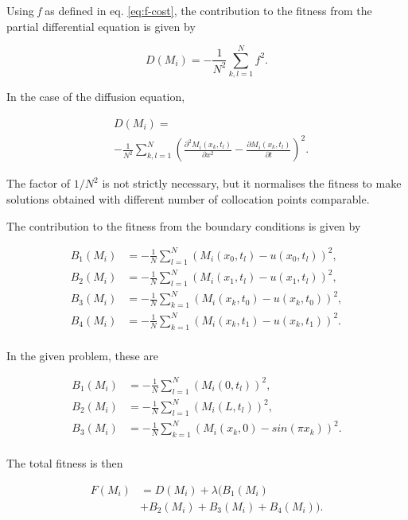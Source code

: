 \documentclass[multicolumn, 9pt]{extarticle}
\begin{document}
Using \textit{f} as defined in eq. \eqref{eq:f-cost}, the contribution to the fitness from the partial differential equation is given by

\begin{equation*}
	D(M_{i}) = -\frac{1}{N^{2}}\sum_{k, l=1}^{N} f^2.
\end{equation*}

In the case of the diffusion equation,

\begin{align*}
	 & D(M_{i}) =
	\\
	 & - \frac{1}{N^{2}} \sum_{k, l=1}^{N} \left( \frac{\partial^2 M_i(x_k, t_l) }{\partial x^2} - \frac{\partial M_i(x_k, t_l)}{\partial t} \right) ^2.
\end{align*}

The factor of $1/N^{2}$ is not strictly necessary, but it normalises the fitness to make solutions obtained with different number of collocation points comparable.


The contribution to the fitness from the boundary conditions is given by

\begin{align*}
	B_1(M_{i}) & = -\frac{1}{N} \sum_{l=1}^{N} \left( M_i(x_0, t_l)- u(x_0, t_l)\right) ^2, \\
	B_2(M_{i}) & = -\frac{1}{N} \sum_{l=1}^{N} (M_i(x_1, t_l)- u(x_1, t_l))^2,              \\
	B_3(M_{i}) & = -\frac{1}{N} \sum_{k=1}^{N} (M_i(x_k, t_0)- u(x_k, t_0))^2,              \\
	B_4(M_{i}) & = -\frac{1}{N} \sum_{k=1}^{N} (M_i(x_k, t_1)- u(x_k, t_1))^2.              \\
\end{align*}

In the given problem, these are

\begin{align*}
	B_1(M_{i}) & = -\frac{1}{N} \sum_{l=1}^{N} \left( M_i(0, t_l)\right) ^2,     \\
	B_2(M_{i}) & = -\frac{1}{N} \sum_{l=1}^{N} (M_i(L, t_l))^2,                  \\
	B_3(M_{i}) & = -\frac{1}{N} \sum_{k=1}^{N} (M_i(x_k, 0) - sin(\pi x_{k}))^2. \\
\end{align*}


The total fitness is then

\begin{align*}
	F(M_{i}) & = D(M_{i}) + \lambda  ( B_1(M_{i})             \\
	         & +  B_2(M_{i})  +  B_3(M_{i})  + B_4(M_{i})  ).
\end{align*}
\end{document}
